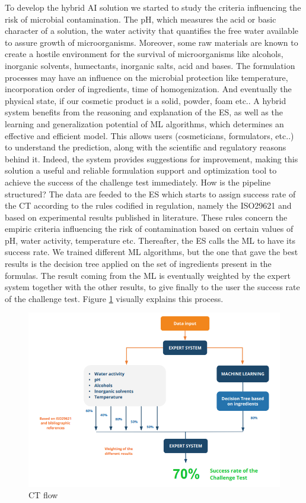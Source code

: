 \documentclass[a4paper,12pt,twoside]{report}
\begin{document}
To develop the hybrid AI solution we started to study the criteria influencing the risk of microbial contamination. The pH, which measures the acid or basic character of a solution, the water activity that quantifies the free water available to assure growth of microorganisms. Moreover, some raw materials are known to create a hostile environment for the survival of microorganisms like alcohols, inorganic solvents, humectants, inorganic salts, acid and bases. The formulation processes may have an influence on the microbial protection like temperature, incorporation order of ingredients, time of homogenization. And eventually the physical state, if our cosmetic product is a solid, powder, foam etc..
A hybrid system benefits from the reasoning and explanation of the ES, as well as the learning and generalization potential of ML algorithms, which determines an effective and efficient model. 
This allows users (cosmeticians, formulators, etc..) to understand the prediction, along with the scientific and regulatory reasons behind it. Indeed, the system provides suggestions for improvement, making this solution a useful and reliable formulation support and optimization tool to achieve the success of the challenge test immediately. 
How is the pipeline structured? The data are feeded to the ES which starts to assign success rate of the CT according to the rules codified in regulation, namely the ISO29621 and based on experimental results published in literature. These rules concern the empiric criteria influencing the risk of contamination based on certain values of pH, water activity, temperature etc. 
Thereafter, the ES calls the ML to have its success rate. We trained different ML algorithms, but the one that gave the best results is the decision tree applied on the set of ingredients present in the formulas. The result coming from the ML is eventually weighted by the expert system together with the other results, to give finally to the user the success rate of the challenge test. Figure \ref{ctflow} visually explains this process.

\begin{figure}
		\includegraphics[width=\textwidth]{images/ctFlow}
	\caption[WorkFlow of CT prediction in CF]{CT flow}
	\label{ctflow}
\end{figure}
\end{document}
